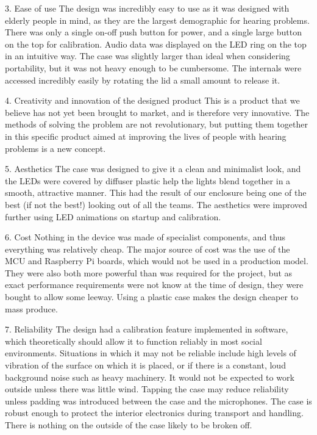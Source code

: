 \documentclass[a4paper]{article}
\begin{document}
3. Ease of use The design was incredibly easy to use as it was designed with
elderly people in mind, as they are the largest demographic for hearing
problems. There was only a single on-off push button for power, and a single
large button on the top for calibration. Audio data was displayed on the LED
ring on the top in an intuitive way.  The case was slightly larger than ideal
when considering portability, but it was not heavy enough to be cumbersome.  The
internals were accessed incredibly easily by rotating the lid a small amount to
release it.

4. Creativity and innovation of the designed product This is a product that we
believe has not yet been brought to market, and is therefore very innovative.
The methods of solving the problem are not revolutionary, but putting them
together in this specific product aimed at improving the lives of people with
hearing problems is a new concept.

5. Aesthetics The case was designed to give it a clean and minimalist look, and
the LEDs were covered by diffuser plastic help the lights blend together in a
smooth, attractive manner. This had the result of our enclosure being one of the
best (if not the best!) looking out of all the teams. The aesthetics were
improved further using LED animations on startup and calibration.

6. Cost Nothing in the device was made of specialist components, and thus
everything was relatively cheap. The major source of cost was the use of the MCU
and Raspberry Pi boards, which would not be used in a production model. They
were also both more powerful than was required for the project, but as exact
performance requirements were not know at the time of design, they were bought
to allow some leeway. Using a plastic case makes the design cheaper to mass
produce.

7. Reliability The design had a calibration feature implemented in software,
which theoretically should allow it to function reliably in most social
environments. Situations in which it may not be reliable include high levels of
vibration of the surface on which it is placed, or if there is a constant, loud
background noise such as heavy machinery. It would not be expected to work
outside unless there was little wind. Tapping the case may reduce reliability
unless padding was introduced between the case and the microphones.  The case is
robust enough to protect the interior electronics during transport and handling.
There is nothing on the outside of the case likely to be broken off.
\end{document}
